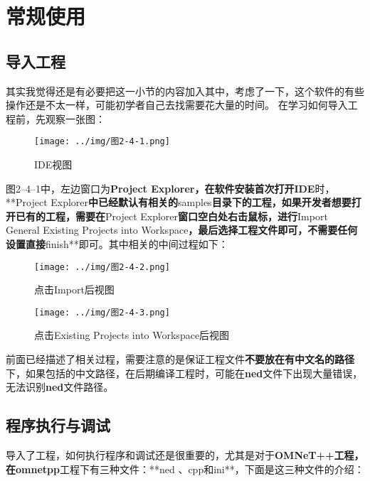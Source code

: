 \section{常规使用}
\label{常规使用}

\subsection{导入工程}
\label{导入工程}

其实我觉得还是有必要把这一小节的内容加入其中，考虑了一下，这个软件的有些操作还是不太一样，可能初学者自己去找需要花大量的时间。
在学习如何导入工程前，先观察一张图：

\begin{figure}[htbp]
\centering
\texttt{[image: ../img/图2-4-1.png]}
\caption{IDE视图}
\end{figure}

图2--4--1中，左边窗口为\textbf{Project Explorer\textbf{，在软件安装首次打开}IDE}时，**Project Explorer\textbf{中已经默认有相关的}samples\textbf{目录下的工程，如果开发者想要打开已有的工程，需要在}Project Explorer\textbf{窗口空白处右击鼠标，进行}Import \textbar{} General \textbar{} Existing Projects into Workspace\textbf{，最后选择工程文件即可，不需要任何设置直接}finish**即可。其中相关的中间过程如下：

\begin{figure}[htbp]
\centering
\texttt{[image: ../img/图2-4-2.png]}
\caption{点击Import后视图}
\end{figure}

\begin{figure}[htbp]
\centering
\texttt{[image: ../img/图2-4-3.png]}
\caption{点击Existing Projects into Workspace后视图}
\end{figure}

前面已经描述了相关过程，需要注意的是保证工程文件\textbf{不要放在有中文名的路径}下，如果包括的中文路径，在后期编译工程时，可能在\textbf{ned}文件下出现大量错误，无法识别\textbf{ned}文件路径。

\subsection{程序执行与调试}
\label{程序执行与调试}

导入了工程，如何执行程序和调试还是很重要的，尤其是对于\textbf{OMNeT++\textbf{工程，在}omnetpp}工程下有三种文件：**ned 、cpp和ini**，下面是这三种文件的介绍：

